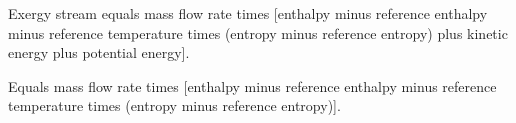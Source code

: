 Exergy stream equals mass flow rate times [enthalpy minus reference enthalpy minus reference temperature times (entropy minus reference entropy) plus kinetic energy plus potential energy].  

Equals mass flow rate times [enthalpy minus reference enthalpy minus reference temperature times (entropy minus reference entropy)].